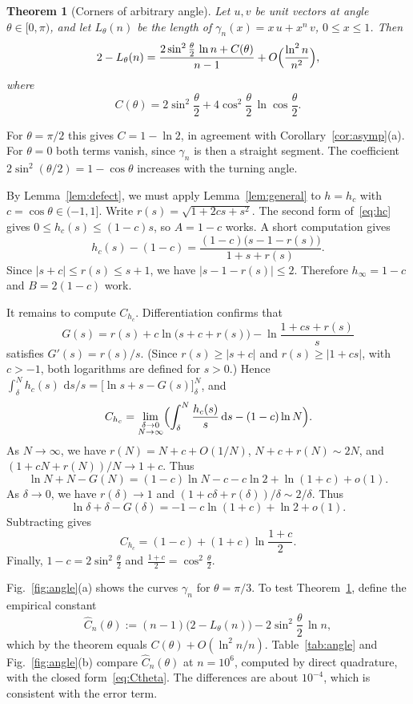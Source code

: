 \documentclass[journal]{IEEEtran}
\newtheorem{theorem}{Theorem}
\newcommand{\dd}{\,\mathrm{d}}
\begin{document}
\begin{theorem}[Corners of arbitrary angle]\label{thm:angle}
Let $u,v$ be unit vectors at angle $\theta\in[0,\pi)$, and let $L_\theta(n)$ be the length of
$\gamma_n(x)=x\,u+x^n\,v$, $0\le x\le1$. Then
\[
  2-L_\theta(n)=\frac{2\sin^2\frac{\theta}{2}\,\ln n+C(\theta)}{n-1}
  +O\Bigl(\frac{\ln^2n}{n^2}\Bigr),
\]
where
\begin{equation}\label{eq:Ctheta}
  C(\theta)=2\sin^2\frac{\theta}{2}+4\cos^2\frac{\theta}{2}\,\ln\cos\frac{\theta}{2}.
\end{equation}
\end{theorem}

For $\theta=\pi/2$ this gives $C=1-\ln2$, in agreement with Corollary~\ref{cor:asymp}(a). For
$\theta=0$ both terms vanish, since $\gamma_n$ is then a straight segment. The
coefficient $2\sin^2(\theta/2)=1-\cos\theta$ increases with the turning angle.

\begin{IEEEproof}
By Lemma~\ref{lem:defect}, we must apply Lemma~\ref{lem:general} to $h=h_c$ with
$c=\cos\theta\in(-1,1]$. Write $r(s)=\sqrt{1+2cs+s^2}$. The second form of~\eqref{eq:hc} gives
$0\le h_c(s)\le(1-c)s$, so $A=1-c$ works. A short computation gives
\[
  h_c(s)-(1-c)=\frac{(1-c)\bigl(s-1-r(s)\bigr)}{1+s+r(s)}.
\]
Since $|s+c|\le r(s)\le s+1$, we have $|s-1-r(s)|\le2$. Therefore $h_\infty=1-c$ and
$B=2(1-c)$ work.

It remains to compute $C_{h_c}$. Differentiation confirms that
\[
  G(s)=r(s)+c\ln\bigl(s+c+r(s)\bigr)-\ln\frac{1+cs+r(s)}{s}
\]
satisfies $G'(s)=r(s)/s$. (Since $r(s)\ge|s+c|$ and $r(s)\ge|1+cs|$, with $c>-1$, both
logarithms are defined for $s>0$.) Hence
$\int_\delta^Nh_c(s)\,\dd s/s=\bigl[\ln s+s-G(s)\bigr]_\delta^N$, and
\[
  C_{h_c}=\lim_{\substack{\delta\to0\\N\to\infty}}
  \Bigl(\int_\delta^N\frac{h_c(s)}{s}\dd s-(1-c)\ln N\Bigr).
\]
As $N\to\infty$, we have $r(N)=N+c+O(1/N)$, $N+c+r(N)\sim2N$, and $(1+cN+r(N))/N\to1+c$. Thus
\[
  \ln N+N-G(N)=(1-c)\ln N-c-c\ln2+\ln(1+c)+o(1).
\]
As $\delta\to0$, we have $r(\delta)\to1$ and $(1+c\delta+r(\delta))/\delta\sim2/\delta$. Thus
\[
  \ln\delta+\delta-G(\delta)=-1-c\ln(1+c)+\ln2+o(1).
\]
Subtracting gives
\[
  C_{h_c}=(1-c)+(1+c)\ln\frac{1+c}{2}.
\]
Finally, $1-c=2\sin^2\frac\theta2$ and $\frac{1+c}{2}=\cos^2\frac\theta2$.
\end{IEEEproof}

Fig.~\ref{fig:angle}(a) shows the curves $\gamma_n$ for $\theta=\pi/3$. To test
Theorem~\ref{thm:angle}, define the empirical constant
\[
  \widehat C_n(\theta):=(n-1)\bigl(2-L_\theta(n)\bigr)-2\sin^2\frac\theta2\,\ln n,
\]
which by the theorem equals $C(\theta)+O(\ln^2n/n)$. Table~\ref{tab:angle} and
Fig.~\ref{fig:angle}(b) compare $\widehat C_n(\theta)$ at $n=10^6$, computed by direct
quadrature, with the closed form~\eqref{eq:Ctheta}. The differences are about $10^{-4}$, which
is consistent with the error term.
\end{document}
